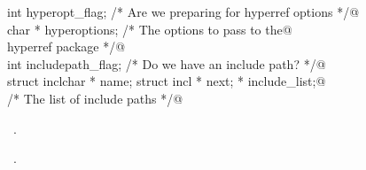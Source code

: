 \documentclass[a4paper]{report}
\begin{document}
\begin{flushleft}
\begin{minipage}{\linewidth}
\begin{list}{}{}
\mbox{}\verb@extern int hyperopt_flag; /* Are we preparing for hyperref options */@\\
\mbox{}\verb@extern char * hyperoptions; /* The options to pass to the@\\
\mbox{}\verb@                               hyperref package */@\\
\mbox{}\verb@extern int includepath_flag; /* Do we have an include path? */@\\
\mbox{}\verb@extern struct incl{char * name; struct incl * next;} * include_list;@\\
\mbox{}\verb@                       /* The list of include paths */@\\
\mbox{}\verb@@{\NWsep}
\end{list}
\vspace{-1.5ex}
\footnotesize
\begin{list}{}{\setlength{\itemsep}{-\parsep}\setlength{\itemindent}{-\leftmargin}}
\item \NWtxtMacroDefBy\ .
\item \NWtxtMacroRefIn\ .

\end{list}
\end{minipage}
\end{flushleft}
\end{document}
